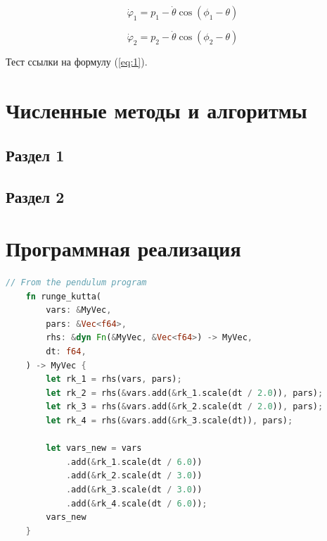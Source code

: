 \documentclass[14pt,oneside]{extarticle}
\begin{document}
\begin{equation}
    \dot{\varphi}_{1}=p_{1}-\dot{\theta}\cos(\phi_{1}-\theta)
\end{equation}

\begin{equation}
    \dot{\varphi}_{2}=p_{2}-\dot{\theta}\cos(\phi_{2}-\theta)
\end{equation}

Тест ссылки на формулу (\ref{eq:1}).

\pagebreak
\section{Численные методы и алгоритмы}

\subsection{Раздел 1}

\subsection{Раздел 2}

\pagebreak
\section{Программная реализация}

\begin{lstlisting}[language=rust,caption={Программная реализация метода Рунге-Кутты},label={listing-1}]
    // From the pendulum program
    fn runge_kutta(
        vars: &MyVec,
        pars: &Vec<f64>,
        rhs: &dyn Fn(&MyVec, &Vec<f64>) -> MyVec,
        dt: f64,
    ) -> MyVec {
        let rk_1 = rhs(vars, pars);
        let rk_2 = rhs(&vars.add(&rk_1.scale(dt / 2.0)), pars);
        let rk_3 = rhs(&vars.add(&rk_2.scale(dt / 2.0)), pars);
        let rk_4 = rhs(&vars.add(&rk_3.scale(dt)), pars);
    
        let vars_new = vars
            .add(&rk_1.scale(dt / 6.0))
            .add(&rk_2.scale(dt / 3.0))
            .add(&rk_3.scale(dt / 3.0))
            .add(&rk_4.scale(dt / 6.0));
        vars_new
    }
    \end{lstlisting}
    
\end{document}
